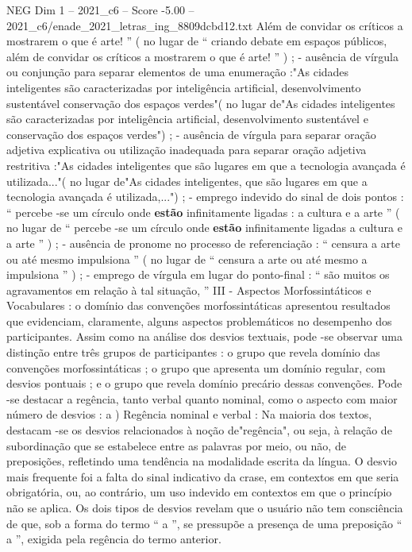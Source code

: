 \begin{textsample}{NEG Dim 1 – 2021\_c6 – Score -5.00 – 2021\_c6/enade\_2021\_letras\_ing\_8809dcbd12.txt}
Além de convidar os críticos a mostrarem o que é arte! ” ( no lugar de “ criando debate em espaços públicos, além de convidar os críticos a mostrarem o que é arte! ” ) ; - ausência de vírgula ou conjunção para separar elementos de uma enumeração :"As cidades inteligentes são caracterizadas por inteligência artificial, desenvolvimento sustentável conservação dos espaços verdes"( no lugar de"As cidades inteligentes são caracterizadas por inteligência artificial, desenvolvimento sustentável e conservação dos espaços verdes") ; - ausência de vírgula para separar oração adjetiva explicativa ou utilização inadequada para separar oração adjetiva restritiva :"As cidades inteligentes que são lugares em que a tecnologia avançada é utilizada..."( no lugar de"As cidades inteligentes, que são lugares em que a tecnologia avançada é utilizada,...") ; - emprego indevido do sinal de dois pontos : “ percebe -se um círculo onde \textbf{estão} infinitamente ligadas : a cultura e a arte ” ( no lugar de “ percebe -se um círculo onde \textbf{estão} infinitamente ligadas a cultura e a arte ” ) ; - ausência de pronome no processo de referenciação : “ censura a arte ou até mesmo impulsiona ” ( no lugar de “ censura a arte ou até mesmo a impulsiona ” ) ; - emprego de vírgula em lugar do ponto-final : “ são muitos os agravamentos em relação à tal situação, ” III - Aspectos Morfossintáticos e Vocabulares : o domínio das convenções morfossintáticas apresentou resultados que evidenciam, claramente, alguns aspectos problemáticos no desempenho dos participantes.
Assim como na análise dos desvios textuais, pode -se observar uma distinção entre três grupos de participantes : o grupo que revela domínio das convenções morfossintáticas ; o grupo que apresenta um domínio regular, com desvios pontuais ; e o grupo que revela domínio precário dessas convenções.
Pode -se destacar a regência, tanto verbal quanto nominal, como o aspecto com maior número de desvios : a ) Regência nominal e verbal : Na maioria dos textos, destacam -se os desvios relacionados à noção de"regência", ou seja, à relação de subordinação que se estabelece entre as palavras por meio, ou não, de preposições, refletindo uma tendência na modalidade escrita da língua.
O desvio mais frequente foi a falta do sinal indicativo da crase, em contextos em que seria obrigatória, ou, ao contrário, um uso indevido em contextos em que o princípio não se aplica.
Os dois tipos de desvios revelam que o usuário não tem consciência de que, sob a forma do termo “ a ”, se pressupõe a presença de uma preposição “ a ”, exigida pela regência do termo anterior.

\end{textsample}

